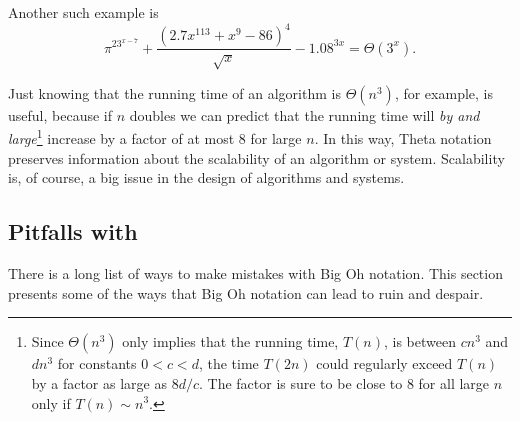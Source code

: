 Another such example is
\[
{{\pi^23^{x-7} + \frac{(2.7x^{113} + x^9- 86)^4}{\sqrt{x}} - 1.08^{3x}}} =
\varTheta(3^x).
\]

Just knowing that the running time of an algorithm is $\varTheta(n^3)$, for
example, is useful, because if $n$ doubles we can predict that the running
time will \emph{by and large}\footnote{Since $\varTheta(n^3)$ only implies
that the running time, $T(n)$, is between $cn^3$ and $dn^3$ for constants
$0<c<d$, the time $T(2n)$ could regularly exceed $T(n)$ by a factor as large
as $8d/c$.  The factor is sure to be close to 8 for all large $n$ only if
$T(n) \sim n^3$.} increase by a factor of at most $8$ for large $n$.  In
this way, Theta notation preserves information about the scalability of an
algorithm or system.  Scalability is, of course, a big issue in the design
of algorithms and systems.

\subsection{Pitfalls with }

There is a long list of ways to make mistakes with Big Oh notation.
This section presents some of the ways that Big Oh notation can lead
to ruin and despair.

